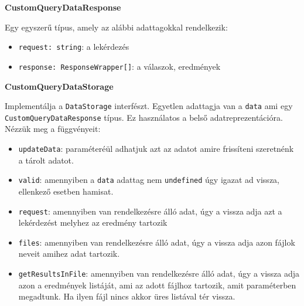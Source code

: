 \vspace{14pt}
\noindent \textbf{CustomQueryDataResponse}


\noindent Egy egyszerű típus, amely az alábbi adattagokkal rendelkezik:

\begin{itemize}
    \item \lstinline{request: string}: a lekérdezés
    
    \item \lstinline{response: ResponseWrapper[]}: a válaszok, eredmények

\end{itemize}









\vspace{14pt}
\noindent \textbf{CustomQueryDataStorage}



\noindent Implementálja a \lstinline{DataStorage} interfészt. Egyetlen adattagja van a \lstinline{data} ami egy \lstinline{CustomQueryDataResponse} típus. Ez használatos a belső adatreprezentációra. Nézzük meg a függvényeit:

\begin{itemize}
    \item \lstinline{updateData}: paraméteréül adhatjuk azt az adatot amire frissíteni szeretnénk a tárolt adatot.
    
    \item \lstinline{valid}: amennyiben a \lstinline{data} adattag nem \lstinline{undefined} úgy igazat ad vissza, ellenkező esetben hamisat. 
    
    \item \lstinline{request}: amennyiben van rendelkezésre álló adat, úgy a vissza adja azt a lekérdezést melyhez az eredmény tartozik
    
    \item \lstinline{files}: amennyiben van rendelkezésre álló adat, úgy a vissza adja azon fájlok neveit amihez adat tartozik.
    
    \item \lstinline{getResultsInFile}: amennyiben van rendelkezésre álló adat, úgy a vissza adja azon a eredmények listáját, ami az adott fájlhoz tartozik, amit paraméterben megadtunk. Ha ilyen fájl nincs akkor üres listával tér vissza.
    
    
\end{itemize}


